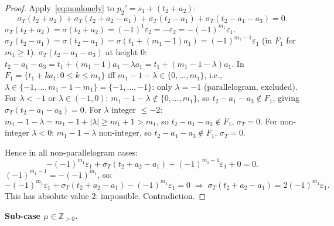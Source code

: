 \documentclass{article}
\begin{document}
\begin{proof}
Apply~\eqref{eq:nonlonely} to $p_2'=s_1+(t_2+a_2)$:
\[
  \sigma_T(t_2+a_2)+\sigma_T(t_2+a_2-a_1)+\sigma_T(t_2-a_1)+\sigma_T(t_2-a_1-a_3)=0.
\]
$\sigma_T(t_2+a_2)=\sigma(t_2+a_2)=(-1)^1\varepsilon_2=-\varepsilon_2=-(-1)^{m_1}\varepsilon_1$.
$\sigma_T(t_2-a_1)=\sigma(t_2-a_1)=\sigma(t_1+(m_1-1)a_1)=(-1)^{m_1-1}\varepsilon_1$ (in $F_1$ for $m_1\ge 1$).
$\sigma_T(t_2-a_1-a_3)$ at height $0$: $t_2-a_1-a_3=t_1+(m_1-1)a_1-\lambda a_1=t_1+(m_1-1-\lambda)a_1$.
In $F_1=\{t_1+ka_1:0\le k\le m_1\}$ iff $m_1-1-\lambda\in\{0,\dots,m_1\}$, i.e., $\lambda\in\{-1,\dots,m_1-1-m_1\}=\{-1,\dots,-1\}$: only $\lambda=-1$ (parallelogram, excluded).
For $\lambda<-1$ or $\lambda\in(-1,0)$: $m_1-1-\lambda\notin\{0,\dots,m_1\}$, so $t_2-a_1-a_3\notin F_1$, giving $\sigma_T(t_2-a_1-a_3)=0$.
For $\lambda$ integer $\le -2$: $m_1-1-\lambda=m_1-1+|\lambda|\ge m_1+1>m_1$, so $t_2-a_1-a_3\notin F_1$, $\sigma_T=0$.
For non-integer $\lambda<0$: $m_1-1-\lambda$ non-integer, so $t_2-a_1-a_3\notin F_1$, $\sigma_T=0$.

Hence in all non-parallelogram cases:
\[
  -(-1)^{m_1}\varepsilon_1+\sigma_T(t_2+a_2-a_1)+(-1)^{m_1-1}\varepsilon_1+0=0.
\]
$(-1)^{m_1-1}=-(-1)^{m_1}$, so:
\[
  -(-1)^{m_1}\varepsilon_1+\sigma_T(t_2+a_2-a_1)-(-1)^{m_1}\varepsilon_1=0
  \;\Rightarrow\;
  \sigma_T(t_2+a_2-a_1)=2(-1)^{m_1}\varepsilon_1.
\]
This has absolute value $2$: impossible.  Contradiction.
\end{proof}

\medskip
\noindent\textbf{Sub-case $\mu\in\mathbb{Z}_{>0}$.}
\end{document}
